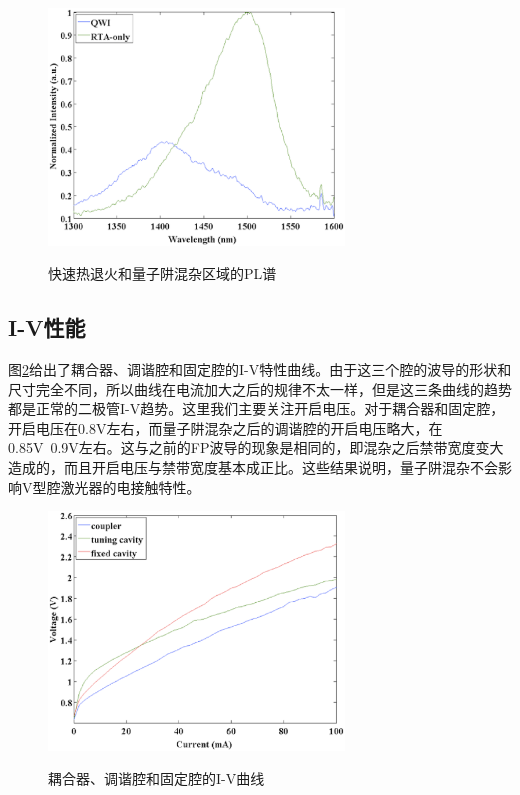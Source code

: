 \documentclass{ZJUthesis}
\begin{document}
\begin{figure}[!ht]
  \centering
  \includegraphics[width=0.7\textwidth]{./Pictures/single_pl2.eps}\\
  \caption{快速热退火和量子阱混杂区域的PL谱}
  \label{fig_single_pl2}
\end{figure}

\subsection{I-V性能}

图\ref{fig_single_iv}给出了耦合器、调谐腔和固定腔的I-V特性曲线。由于这三个腔的波导的形状和尺寸完全不同，所以曲线在电流加大之后的规律不太一样，但是这三条曲线的趋势都是正常的二极管I-V趋势。这里我们主要关注开启电压。对于耦合器和固定腔，开启电压在0.8V左右，而量子阱混杂之后的调谐腔的开启电压略大，在0.85V~0.9V左右。这与之前的FP波导的现象是相同的，即混杂之后禁带宽度变大造成的，而且开启电压与禁带宽度基本成正比。这些结果说明，量子阱混杂不会影响V型腔激光器的电接触特性。

\begin{figure}[!ht]
  \centering
  \includegraphics[width=0.7\textwidth]{./Pictures/single_iv.eps}\\
  \caption{耦合器、调谐腔和固定腔的I-V曲线}
  \label{fig_single_iv}
\end{figure}
\end{document}
